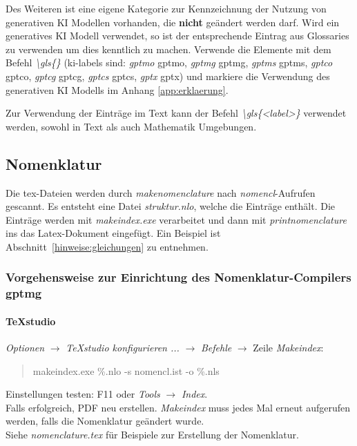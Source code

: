 Des Weiteren ist eine eigene Kategorie zur Kennzeichnung der Nutzung von generativen KI Modellen vorhanden, die \textbf{nicht} geändert werden darf.
Wird ein generatives KI Modell verwendet, so ist der entsprechende Eintrag aus Glossaries zu verwenden um dies kenntlich zu machen.
Verwende die Elemente mit dem Befehl \textit{\textbackslash gls\{<ki-label>\}} (ki-labels sind: \textit{gptmo} \gls{gptmo}, \textit{gptmg} \gls{gptmg}, \textit{gptms} \gls{gptms}, \textit{gptco} \gls{gptco}, \textit{gptcg} \gls{gptcg}, \textit{gptcs} \gls{gptcs}, \textit{gptx} \gls{gptx}) und markiere die Verwendung des generativen KI Modells im Anhang \ref{app:erklaerung}.

Zur Verwendung der Einträge im Text kann der Befehl \textit{\textbackslash gls\{<label>\}} verwendet werden, sowohl in Text als auch Mathematik Umgebungen.

\subsection*{Nomenklatur}
Die tex-Dateien werden durch \textit{makenomenclature} nach \textit{nomencl}-Aufrufen gescannt.
Es entsteht eine Datei \textit{struktur.nlo}, welche die Einträge enthält.
Die Einträge werden mit \textit{makeindex.exe} verarbeitet und dann mit
\textit{printnomenclature} ins das Latex-Dokument eingefügt.
Ein Beispiel ist Abschnitt~\ref{hinweise:gleichungen} zu entnehmen.

\subsubsection*{Vorgehensweise zur Einrichtung des Nomenklatur-Compilers  \gls{gptmg}}

\paragraph{TeXstudio}

\textit{Optionen} $\rightarrow$ \textit{TeXstudio konfigurieren ...} $\rightarrow$ \textit{Befehle} $\rightarrow$ Zeile \textit{Makeindex}:
\begin{quotation}
makeindex.exe \%.nlo -s nomencl.ist -o \%.nls 
\end{quotation}

\noindent Einstellungen testen: F11 oder \textit{Tools} $\rightarrow$ \textit{Index}. \\
Falls erfolgreich, PDF neu erstellen. \textit{Makeindex} muss jedes Mal erneut aufgerufen werden, falls die Nomenklatur geändert wurde. \\
Siehe \textit{nomenclature.tex} für Beispiele zur Erstellung der Nomenklatur.


